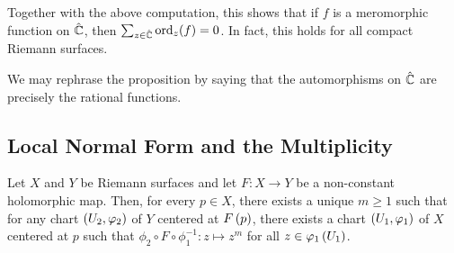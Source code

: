 \documentclass[../Moduli_Spaces_of_Riemann_Surfaces.tex]{subfiles}
\begin{document}
    \begin{remark}
        Together with the above computation, this shows that if $f$ is a meromorphic function on $\hat{\mathbb{C}}$, then $\sum_{z\in\hat{\mathbb{C}}}\operatorname{ord}_z\!\left(f\right)=0$. In fact, this holds for all compact Riemann surfaces.\exqed
    \end{remark}
    \begin{remark}
        We may rephrase the proposition by saying that the automorphisms on $\hat{\mathbb{C}}$ are precisely the rational functions.\exqed
    \end{remark}
    \subsection{Local Normal Form and the Multiplicity}
    \begin{theorem}\label{1.2:thm:local_normal_form}
        Let $X$ and $Y$ be Riemann surfaces and let $F:X\to Y$ be a non-constant holomorphic map. Then, for every $p\in X$, there exists a unique $m\geq1$ such that for any chart $\left(U_2,\varphi_2\right)$ of $Y$ centered at $F\left(p\right)$, there exists a chart $\left(U_1,\varphi_1\right)$ of $X$ centered at $p$ such that $\phi_2\circ F\circ\phi_1^{-1}:z\mapsto z^m$ for all $z\in\varphi_1\left(U_1\right)$.
    \end{theorem}
    \vspace{-0.05in}
\end{document}
